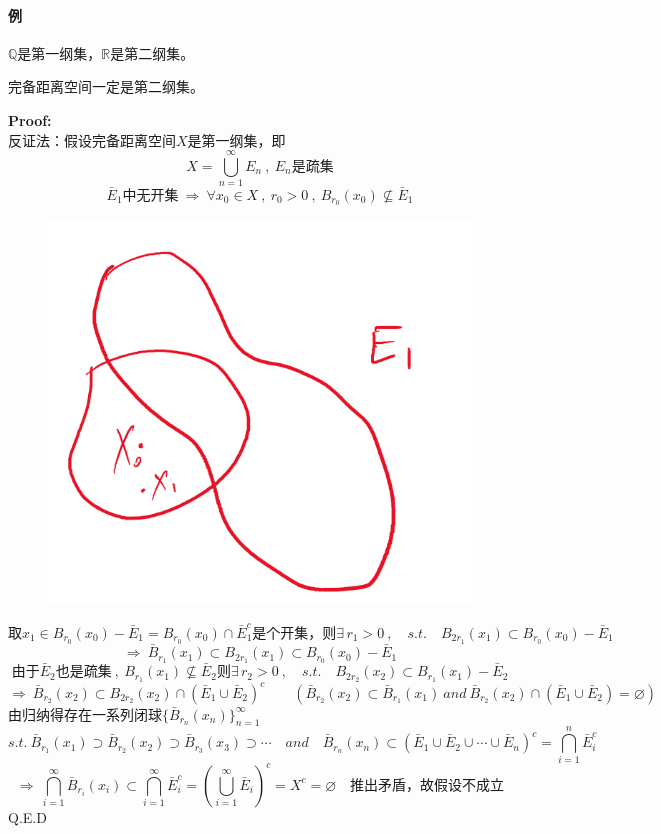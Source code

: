 \paragraph*{例} \quad $\mathbb{Q}$是第一纲集，$\mathbb{R}$是第二纲集。
\begin{theorem}[$Baire$定理] \label{the:Baire}
    完备距离空间一定是第二纲集。
\end{theorem}
\textbf{Proof:}\\
反证法：假设完备距离空间$X$是第一纲集，即
\[X=\bigcup_{n=1}^{\infty}E_n \ , \ E_n\text{是疏集}\]
\[\bar{E}_1\text{中无开集} \ \Rightarrow \ \forall x_0 \in X \ , \ r_0>0 \ , \ B_{r_0}(x_0) \nsubseteq \bar{E}_1\]
\begin{figure}[htbp]
    \center
    \includegraphics[scale=0.4]{./fig/2.1.4_2.png}
\end{figure}
\[\text{取}x_1 \in B_{r_0}(x_0)-\bar{E}_1=B_{r_0}(x_0)\cap\bar{E}_1^c\text{是个开集，则}\exists \, r_1>0 \ , \quad s.t. \quad B_{2r_1}(x_1) \subset B_{r_0}(x_0)-\bar{E}_1\]
\[\Rightarrow \ \bar{B}_{r_1}(x_1) \subset B_{2r_1}(x_1) \subset B_{r_0}(x_0)-\bar{E}_1\]
\[\text{由于}\bar{E}_2\text{也是疏集} \ , \ B_{r_1}(x_1) \nsubseteq \bar{E}_2\text{则}\exists \, r_2>0 \ , \quad s.t. \quad B_{2r_2}(x_2) \subset B_{r_1}(x_1)-\bar{E}_2\]
\[\Rightarrow \ \bar{B}_{r_2}(x_2) \subset B_{2r_2}(x_2)\cap(\bar{E}_1\cup\bar{E}_2)^c \qquad (\bar{B}_{r_2}(x_2) \subset \bar{B}_{r_1}(x_1) \ and \ \bar{B}_{r_2}(x_2)\cap(\bar{E}_1\cup\bar{E}_2)=\varnothing)\]
由归纳得存在一系列闭球$\{\bar{B}_{r_n}(x_n)\}_{n=1}^{\infty}$
\[s.t. \ \bar{B}_{r_1}(x_1) \supset \bar{B}_{r_2}(x_2) \supset \bar{B}_{r_3}(x_3) \supset \cdots \quad and \quad \bar{B}_{r_n}(x_n)\subset(\bar{E}_1\cup\bar{E}_2\cup\cdots\cup\bar{E}_n)^c=\bigcap_{i=1}^n\bar{E}_i^c\]
\[\Rightarrow \ \bigcap_{i=1}^{\infty}\bar{B}_{r_i}(x_i) \subset \bigcap_{i=1}^{\infty}\bar{E}_i^c=\left(\bigcup_{i=1}^{\infty}\bar{E}_i\right)^c=X^c=\varnothing \quad \text{推出矛盾，故假设不成立}\]
Q.E.D

